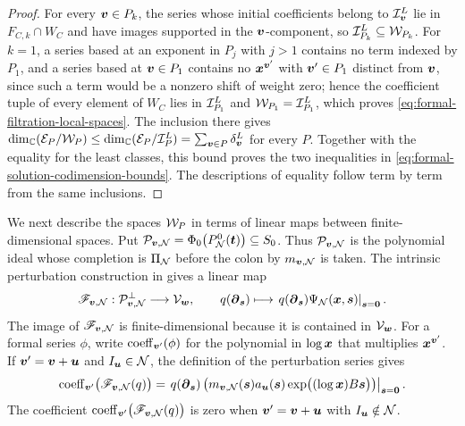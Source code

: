 \begin{proof}
	For every \(\boldsymbol{v}\in P_k\), the series whose initial coefficients belong to \(\mathcal I_{\boldsymbol{v}}^{L}\) lie in \(F_{C,k}\cap W_C\) and have images supported in the \(\boldsymbol{v}\)-component, so \(\mathcal I_{P_k}^{L}\subseteq\mathcal W_{P_k}\).
	For \(k=1\), a series based at an exponent in \(P_j\) with \(j>1\) contains no term indexed by \(P_1\), and a series based at \(\boldsymbol{v}\in P_1\) contains no \(\boldsymbol{x}^{\boldsymbol{v}'}\) with \(\boldsymbol{v}'\in P_1\) distinct from \(\boldsymbol{v}\), since such a term would be a nonzero shift of weight zero; hence the coefficient tuple of every element of \(W_C\) lies in \(\mathcal I_{P_1}^{L}\) and \(\mathcal W_{P_1}=\mathcal I_{P_1}^{L}\), which proves \eqref{eq:formal-filtration-local-spaces}.
	The inclusion there gives \(\dim_{\mathbb C}(\mathcal E_P/\mathcal W_P) \leq \dim_{\mathbb C}(\mathcal E_P/\mathcal I_P^{L}) = \sum_{\boldsymbol{v}\in P}\delta_{\boldsymbol{v}}^{L}\) for every \(P\).
	Together with the equality for the least classes, this bound proves the two inequalities in \eqref{eq:formal-solution-codimension-bounds}.
	The descriptions of equality follow term by term from the same inclusions.
\end{proof}

We next describe the spaces \(\mathcal W_P\) in terms of linear maps between finite-dimensional spaces.
Put \(\mathcal P_{\boldsymbol{v},\mathcal N}=\Phi_0\bigl(P_{\mathcal N}^0(\boldsymbol{t})\bigr) \subseteq S_0\).
Thus \(\mathcal P_{\boldsymbol{v},\mathcal N}\) is the polynomial ideal whose completion is \(\Pi_{\mathcal N}\) before the colon by \(m_{\boldsymbol{v},\mathcal N}\) is taken.
The intrinsic perturbation construction in \cite[Theorem~3.2]{OS25} gives a linear map
\begin{equation}
	\mathscr F_{\boldsymbol{v},\mathcal N}:
	\mathcal P_{\boldsymbol{v},\mathcal N}^{\perp}
	\longrightarrow
	\mathcal V_{\boldsymbol{w}},
	\qquad
	q(\boldsymbol{\partial}_{\boldsymbol{s}})
	\longmapsto
	\left.
	q(\boldsymbol{\partial}_{\boldsymbol{s}})
	\Psi_{\mathcal N}(\boldsymbol{x},\boldsymbol{s})
	\right|_{\boldsymbol{s}=\boldsymbol{0}}.
	\label{eq:full-intrinsic-series-map}
\end{equation}
The image of \(\mathscr F_{\boldsymbol{v},\mathcal N}\) is finite-dimensional because it is contained in \(\mathcal V_{\boldsymbol{w}}\).
For a formal series \(\phi\), write \(\operatorname{coeff}_{\boldsymbol{v}'}(\phi)\) for the polynomial in \(\log\boldsymbol{x}\) that multiplies \(\boldsymbol{x}^{\boldsymbol{v}'}\).
If \(\boldsymbol{v}'=\boldsymbol{v}+\boldsymbol{u}\) and \(I_{\boldsymbol{u}}\in\mathcal N\), the definition of the perturbation series gives
\begin{equation}
	\operatorname{coeff}_{\boldsymbol{v}'}
	\bigl(\mathscr F_{\boldsymbol{v},\mathcal N}(q)\bigr)
	=
	\left.
	q(\boldsymbol{\partial}_{\boldsymbol{s}})
	\left(
	m_{\boldsymbol{v},\mathcal N}(\boldsymbol{s})
	a_{\boldsymbol{u}}(\boldsymbol{s})
	\exp\bigl((\log\boldsymbol{x})B\boldsymbol{s}\bigr)
	\right)
	\right|_{\boldsymbol{s}=\boldsymbol{0}}.
	\label{eq:full-intrinsic-transition-coefficient}
\end{equation}
The coefficient \(\operatorname{coeff}_{\boldsymbol{v}'}\bigl(\mathscr F_{\boldsymbol{v},\mathcal N}(q)\bigr)\) is zero when \(\boldsymbol{v}'=\boldsymbol{v}+\boldsymbol{u}\) with \(I_{\boldsymbol{u}}\notin\mathcal N\).

